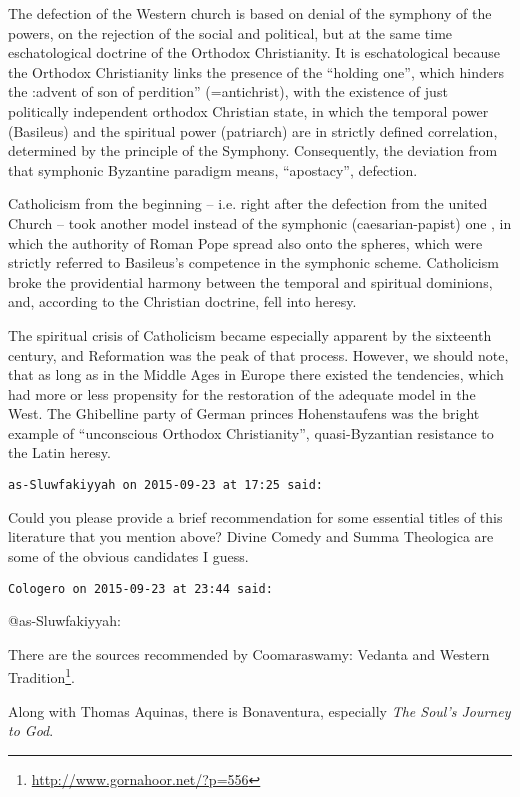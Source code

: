\begin{footnotesize}
\begin{sffamily}
The defection of the Western church is based on denial of the symphony of the powers, on the rejection of the social and political, but at the same time eschatological doctrine of the Orthodox Christianity. It is eschatological because the Orthodox Christianity links the presence of the “holding one”, which hinders the :advent of son of perdition” (=antichrist), with the existence of just politically independent orthodox Christian state, in which the temporal power (Basileus) and the spiritual power (patriarch) are in strictly defined correlation, determined by the principle of the Symphony. Consequently, the deviation from that symphonic Byzantine paradigm means, “apostacy”, defection.

Catholicism from the beginning – i.e. right after the defection from the united Church – took another model instead of the symphonic (caesarian-papist) one , in which the authority of Roman Pope spread also onto the spheres, which were strictly referred to Basileus's competence in the symphonic scheme. Catholicism broke the providential harmony between the temporal and spiritual dominions, and, according to the Christian doctrine, fell into heresy.

The spiritual crisis of Catholicism became especially apparent by the sixteenth century, and Reformation was the peak of that process. However, we should note, that as long as in the Middle Ages in Europe there existed the tendencies, which had more or less propensity for the restoration of the adequate model in the West. The Ghibelline party of German princes Hohenstaufens was the bright example of “unconscious Orthodox Christianity”, quasi-Byzantian resistance to the Latin heresy.


\hfill

\texttt{as-Sluwfakiyyah on 2015-09-23 at 17:25 said:}

Could you please provide a brief recommendation for some essential titles of this literature that you mention above? Divine Comedy and Summa Theologica are some of the obvious candidates I guess.


\hfill

\texttt{Cologero on 2015-09-23 at 23:44 said:}

@as-Sluwfakiyyah:

There are the sources recommended by Coomaraswamy: Vedanta and Western Tradition\footnote{\url{http://www.gornahoor.net/?p=556}}.

Along with Thomas Aquinas, there is Bonaventura, especially \emph{The Soul's Journey to God}.


\end{sffamily}
\end{footnotesize}
